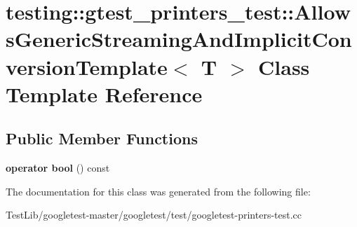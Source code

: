 \hypertarget{classtesting_1_1gtest__printers__test_1_1AllowsGenericStreamingAndImplicitConversionTemplate}{}\section{testing\+:\+:gtest\+\_\+printers\+\_\+test\+:\+:Allows\+Generic\+Streaming\+And\+Implicit\+Conversion\+Template$<$ T $>$ Class Template Reference}
\label{classtesting_1_1gtest__printers__test_1_1AllowsGenericStreamingAndImplicitConversionTemplate}
\subsection*{Public Member Functions}
\begin{DoxyCompactItemize}
\item 
\mbox{\label{classtesting_1_1gtest__printers__test_1_1AllowsGenericStreamingAndImplicitConversionTemplate_af5f8ea44d7d86283b4c004a994ddd7f9}} 
{\bfseries operator bool} () const
\end{DoxyCompactItemize}


The documentation for this class was generated from the following file\+:\begin{DoxyCompactItemize}
\item 
Test\+Lib/googletest-\/master/googletest/test/googletest-\/printers-\/test.\+cc\end{DoxyCompactItemize}
